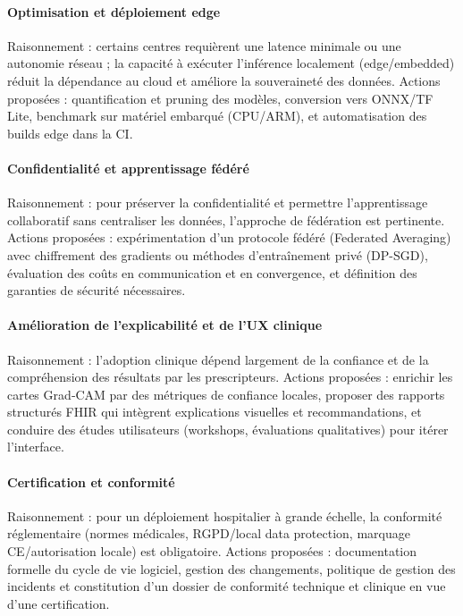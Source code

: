 \paragraph{Optimisation et déploiement edge}  
Raisonnement : certains centres requièrent une latence minimale ou une autonomie réseau ; la capacité à exécuter l'inférence localement (edge/embedded) réduit la dépendance au cloud et améliore la souveraineté des données. Actions proposées : quantification et pruning des modèles, conversion vers ONNX/TF Lite, benchmark sur matériel embarqué (CPU/ARM), et automatisation des builds edge dans la CI.

\paragraph{Confidentialité et apprentissage fédéré}  
Raisonnement : pour préserver la confidentialité et permettre l'apprentissage collaboratif sans centraliser les données, l'approche de fédération est pertinente. Actions proposées : expérimentation d'un protocole fédéré (Federated Averaging) avec chiffrement des gradients ou méthodes d'entraînement privé (DP-SGD), évaluation des coûts en communication et en convergence, et définition des garanties de sécurité nécessaires.

\paragraph{Amélioration de l'explicabilité et de l'UX clinique}  
Raisonnement : l'adoption clinique dépend largement de la confiance et de la compréhension des résultats par les prescripteurs. Actions proposées : enrichir les cartes Grad‑CAM par des métriques de confiance locales, proposer des rapports structurés FHIR qui intègrent explications visuelles et recommandations, et conduire des études utilisateurs (workshops, évaluations qualitatives) pour itérer l'interface.

\paragraph{Certification et conformité}  
Raisonnement : pour un déploiement hospitalier à grande échelle, la conformité réglementaire (normes médicales, RGPD/local data protection, marquage CE/autorisation locale) est obligatoire. Actions proposées : documentation formelle du cycle de vie logiciel, gestion des changements, politique de gestion des incidents et constitution d'un dossier de conformité technique et clinique en vue d'une certification.

